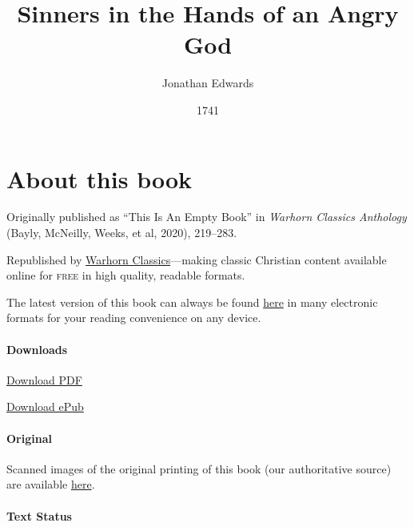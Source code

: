 \documentclass[
]{book}
\title{Sinners in the Hands of an Angry God}
\author{Jonathan Edwards}
\date{1741}
\begin{document}
\maketitle

\mainmatter
{}

{
\setcounter{tocdepth}{1}
\tableofcontents
}
\hypertarget{about-this-book}{%
\chapter*{About this book}\label{about-this-book}}

Originally published as ``This Is An Empty Book'' in \emph{Warhorn Classics Anthology} (Bayly, McNeilly, Weeks, et al, 2020), 219--283.

Republished by \href{https://classics.warhornmedia.com/}{Warhorn Classics}---making classic Christian content available online for \textsc{free} in high quality, readable formats.

The latest version of this book can always be found \href{https://warhornmedia.github.io/edwards-sinners-angry-god/}{here} in many electronic formats for your reading convenience on any device.

\hypertarget{downloads}{%
\subsubsection*{Downloads}\label{downloads}}

\href{https://warhornmedia.github.io/edwards-sinners-angry-god//Edwards-Sinners_In_the-Hands_of_an_Angry_God.pdf}{Download PDF}

\href{https://warhornmedia.github.io/edwards-sinners-angry-god//Edwards-Sinners_In_the-Hands_of_an_Angry_God.epub}{Download ePub}

\hypertarget{original}{%
\subsubsection*{Original}\label{original}}

Scanned images of the original printing of this book (our authoritative source) are available \href{https://digitalcommons.unl.edu/cgi/viewcontent.cgi?referer=https://en.wikipedia.org/\&httpsredir=1\&article=1053\&context=etas}{here}.

\hypertarget{text-status}{%
\subsubsection*{Text Status}\label{text-status}}
\end{document}
